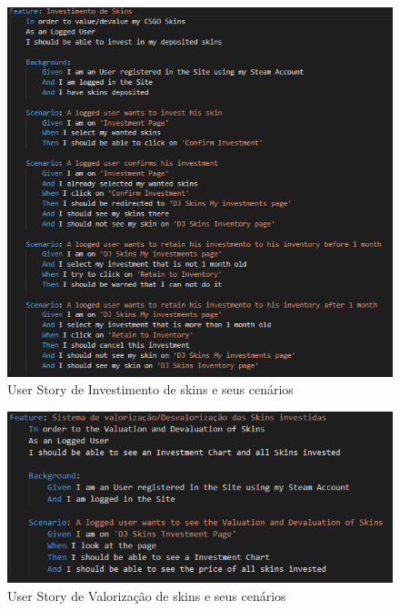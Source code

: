 \documentclass[
    12pt,               %
    openright,          %
    oneside,
    a4paper,            %
    MODELO,             %
    TODO,               %
    english,            %
    brazil              %
    ]{ifsp-spo-inf-ctds} %
\begin{document}
\begin{apendicesenv}
	\begin{figure}[!htb]
		\centering
		\includegraphics[scale=0.9]{Imagens/InvestimentoSkins.png}
		\caption{User Story de Investimento de skins e seus cenários}
	\end{figure}
	
	\begin{figure}[!htb]
		\centering
		\includegraphics[scale=0.9]{Imagens/Valorizacao.png}
		\caption{User Story de Valorização de skins e seus cenários}
	\end{figure}
	

\end{apendicesenv}
\end{document}
